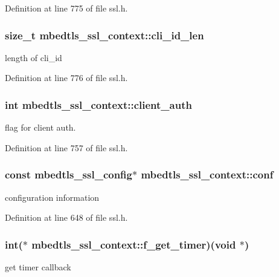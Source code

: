 Definition at line 775 of file ssl.\-h.

\hypertarget{structmbedtls__ssl__context_a2d748130fb769af23d736f462a0bc913}{
\subsubsection[{cli\-\_\-id\-\_\-len}]{\setlength{\rightskip}{0pt plus 5cm}size\-\_\-t mbedtls\-\_\-ssl\-\_\-context\-::cli\-\_\-id\-\_\-len}}\label{structmbedtls__ssl__context_a2d748130fb769af23d736f462a0bc913}
length of cli\-\_\-id 

Definition at line 776 of file ssl.\-h.

\hypertarget{structmbedtls__ssl__context_aac814a12725174dd9da1b1815b0abac0}{
\subsubsection[{client\-\_\-auth}]{\setlength{\rightskip}{0pt plus 5cm}int mbedtls\-\_\-ssl\-\_\-context\-::client\-\_\-auth}}\label{structmbedtls__ssl__context_aac814a12725174dd9da1b1815b0abac0}
flag for client auth. 

Definition at line 757 of file ssl.\-h.

\hypertarget{structmbedtls__ssl__context_af91df820bd8e776101c580a89bac9bf7}{
\subsubsection[{conf}]{\setlength{\rightskip}{0pt plus 5cm}const {\bf mbedtls\-\_\-ssl\-\_\-config}$\ast$ mbedtls\-\_\-ssl\-\_\-context\-::conf}}\label{structmbedtls__ssl__context_af91df820bd8e776101c580a89bac9bf7}
configuration information 

Definition at line 648 of file ssl.\-h.

\hypertarget{structmbedtls__ssl__context_ad7059d547158119e81e09dd731081b12}{
\subsubsection[{f\-\_\-get\-\_\-timer}]{\setlength{\rightskip}{0pt plus 5cm}int($\ast$ mbedtls\-\_\-ssl\-\_\-context\-::f\-\_\-get\-\_\-timer)(void $\ast$)}}\label{structmbedtls__ssl__context_ad7059d547158119e81e09dd731081b12}
get timer callback 

